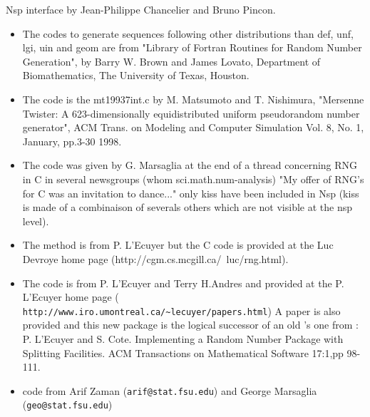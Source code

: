
\begin{manseealso}
\end{manseealso}


\begin{authors}

  Nsp interface by Jean-Philippe Chancelier and Bruno Pincon. 
\begin{itemize}
  \item {} 
  The codes to generate sequences following other distributions than def, unf, lgi,  uin and geom are
  from "Library of Fortran Routines for Random Number  Generation", by Barry W. Brown 
  and James Lovato, Department of Biomathematics, The University of Texas, Houston.  
  
  \item {} 
  The code is the mt19937int.c by M. Matsumoto and  T. Nishimura, "Mersenne Twister: 
  A 623-dimensionally equidistributed  uniform pseudorandom number generator", 
  ACM Trans. on Modeling and  Computer Simulation Vol. 8, No. 1, January, pp.3-30 1998.
  
  \item {} 
  The code was given by G. Marsaglia at the end of a thread concerning RNG in C in several 
  newsgroups (whom sci.math.num-analysis) "My offer of  RNG's for C was an invitation 
  to dance..." only kiss have been included in Nsp (kiss is made of a combinaison of 
  severals others which are not visible at the nsp level).
  
  \item {} 
  The method is from P. L'Ecuyer but the C code is provided at the Luc  Devroye home page 
  (http://cgm.cs.mcgill.ca/~luc/rng.html).
  
  \item {} 
  The code is from P. L'Ecuyer and Terry H.Andres and provided at the P. L'Ecuyer
  home page ( \verb+http://www.iro.umontreal.ca/~lecuyer/papers.html+) A paper is also provided 
  and this new package is the logical successor of an old 's one from : P.  L'Ecuyer
  and S. Cote.   Implementing a Random   Number Package with Splitting Facilities.  ACM Transactions 
  on Mathematical  Software 17:1,pp 98-111.
  
  \item {} 
  code from Arif Zaman (\verb+arif@stat.fsu.edu+) and George Marsaglia (\verb+geo@stat.fsu.edu+)
\end{itemize}

\end{authors}

